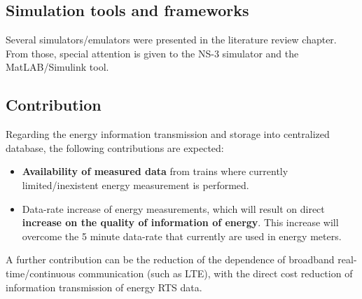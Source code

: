 \subsection{Simulation tools and frameworks}

Several simulators/emulators were presented in the literature review chapter. From those, special attention is given to the NS-3 simulator and the MatLAB/Simulink tool.  


\subsection{Contribution}

Regarding the energy information transmission and storage into centralized database, the following contributions are expected:

\begin{itemize}
	\setlength\itemsep{0em}
	
	\item \textbf{Availability of measured data} from trains where currently limited/inexistent energy measurement is performed.
	
	\item Data-rate increase of energy measurements, which will result on direct \textbf{increase on the quality of information of energy}. This increase will overcome the 5 minute data-rate that currently are used in energy meters.
	
\end{itemize}

A further contribution can be the reduction of the dependence of broadband real-time/continuous communication (such as LTE), with the direct cost reduction of information transmission of energy RTS data.

	
	
